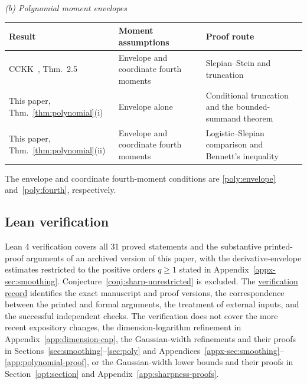 \documentclass[11pt,letterpaper]{article}
\newcommand{\vSix}[1]{{\color{magenta}#1}}
\theoremstyle{remark}
\begin{document}
\begin{table}[!htb]
\medskip
\textit{(b) Polynomial moment envelopes}\par\smallskip
\begin{tabularx}{\textwidth}{@{}>{\raggedright\arraybackslash}p{}
 >{\raggedright\arraybackslash}p{}
 >{\raggedright\arraybackslash}X@{}}
\toprule
Result & Moment assumptions & Proof route \\
\midrule
CCKK~\cite{CCKK2022}, Thm.~2.5 & Envelope and coordinate fourth moments & Slepian--Stein and truncation \\[2pt]
This paper, Thm.~\ref{thm:polynomial}(i) & Envelope alone & Conditional truncation and the bounded-summand theorem \\[2pt]
This paper, Thm.~\ref{thm:polynomial}(ii) & Envelope and coordinate fourth moments & Logistic--Slepian comparison and Bennett's inequality \\
\bottomrule
\end{tabularx}
\smallskip
{\footnotesize\raggedright
The envelope and coordinate fourth-moment conditions are
\eqref{poly:envelope} and~\eqref{poly:fourth}, respectively.\par}
\end{table}

\subsection{Lean verification}\label{sec:lean-introduction}
{Lean 4 verification covers all 31 proved statements and the substantive
printed-proof arguments of an archived version of this paper, with the
derivative-envelope estimates restricted to the positive orders
\(q\ge1\) stated in Appendix~\ref{appx-sec:smoothing}.
Conjecture~\ref{conj:sharp-unrestricted} is excluded. The
\href{https://github.com/VC2015/HDCLTs/blob/0ef13b938895535fe2dcc135b9400688ed97fa61/lean-rectangle-clt-singular/split-v4-certification/printed-proof-extension/README.md}{verification record}
identifies the exact manuscript and proof versions, the correspondence
between the printed and formal arguments, the treatment of external
inputs, and the successful independent checks. The verification does not
\vSix{cover the more recent expository changes, the dimension-logarithm
refinement in Appendix~\ref{app:dimension-cap}, the Gaussian-width
refinements and their proofs in Sections~\ref{sec:smoothing}--\ref{sec:poly}
and Appendices~\ref{appx-sec:smoothing}--\ref{app:polynomial-proof}, or
the Gaussian-width lower bounds and their proofs in
Section~\ref{opt:section} and Appendix~\ref{app:sharpness-proofs}.}}
\end{document}
